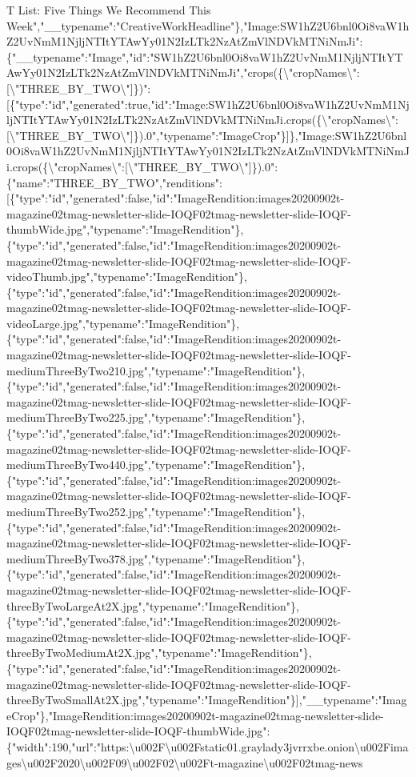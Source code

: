 T List: Five Things We Recommend This
Week","\_\_typename":"CreativeWorkHeadline"\},"Image:SW1hZ2U6bnl0Oi8vaW1hZ2UvNmM1NjljNTItYTAwYy01N2IzLTk2NzAtZmVlNDVkMTNiNmJi":\{"\_\_typename":"Image","id":"SW1hZ2U6bnl0Oi8vaW1hZ2UvNmM1NjljNTItYTAwYy01N2IzLTk2NzAtZmVlNDVkMTNiNmJi","crops(\{\textbackslash{}"cropNames\textbackslash{}":{[}\textbackslash{}"THREE\_BY\_TWO\textbackslash{}"{]}\})":{[}\{"type":"id","generated":true,"id":"Image:SW1hZ2U6bnl0Oi8vaW1hZ2UvNmM1NjljNTItYTAwYy01N2IzLTk2NzAtZmVlNDVkMTNiNmJi.crops(\{\textbackslash{}"cropNames\textbackslash{}":{[}\textbackslash{}"THREE\_BY\_TWO\textbackslash{}"{]}\}).0","typename":"ImageCrop"\}{]}\},"Image:SW1hZ2U6bnl0Oi8vaW1hZ2UvNmM1NjljNTItYTAwYy01N2IzLTk2NzAtZmVlNDVkMTNiNmJi.crops(\{\textbackslash{}"cropNames\textbackslash{}":{[}\textbackslash{}"THREE\_BY\_TWO\textbackslash{}"{]}\}).0":\{"name":"THREE\_BY\_TWO","renditions":{[}\{"type":"id","generated":false,"id":"ImageRendition:images20200902t-magazine02tmag-newsletter-slide-IOQF02tmag-newsletter-slide-IOQF-thumbWide.jpg","typename":"ImageRendition"\},\{"type":"id","generated":false,"id":"ImageRendition:images20200902t-magazine02tmag-newsletter-slide-IOQF02tmag-newsletter-slide-IOQF-videoThumb.jpg","typename":"ImageRendition"\},\{"type":"id","generated":false,"id":"ImageRendition:images20200902t-magazine02tmag-newsletter-slide-IOQF02tmag-newsletter-slide-IOQF-videoLarge.jpg","typename":"ImageRendition"\},\{"type":"id","generated":false,"id":"ImageRendition:images20200902t-magazine02tmag-newsletter-slide-IOQF02tmag-newsletter-slide-IOQF-mediumThreeByTwo210.jpg","typename":"ImageRendition"\},\{"type":"id","generated":false,"id":"ImageRendition:images20200902t-magazine02tmag-newsletter-slide-IOQF02tmag-newsletter-slide-IOQF-mediumThreeByTwo225.jpg","typename":"ImageRendition"\},\{"type":"id","generated":false,"id":"ImageRendition:images20200902t-magazine02tmag-newsletter-slide-IOQF02tmag-newsletter-slide-IOQF-mediumThreeByTwo440.jpg","typename":"ImageRendition"\},\{"type":"id","generated":false,"id":"ImageRendition:images20200902t-magazine02tmag-newsletter-slide-IOQF02tmag-newsletter-slide-IOQF-mediumThreeByTwo252.jpg","typename":"ImageRendition"\},\{"type":"id","generated":false,"id":"ImageRendition:images20200902t-magazine02tmag-newsletter-slide-IOQF02tmag-newsletter-slide-IOQF-mediumThreeByTwo378.jpg","typename":"ImageRendition"\},\{"type":"id","generated":false,"id":"ImageRendition:images20200902t-magazine02tmag-newsletter-slide-IOQF02tmag-newsletter-slide-IOQF-threeByTwoLargeAt2X.jpg","typename":"ImageRendition"\},\{"type":"id","generated":false,"id":"ImageRendition:images20200902t-magazine02tmag-newsletter-slide-IOQF02tmag-newsletter-slide-IOQF-threeByTwoMediumAt2X.jpg","typename":"ImageRendition"\},\{"type":"id","generated":false,"id":"ImageRendition:images20200902t-magazine02tmag-newsletter-slide-IOQF02tmag-newsletter-slide-IOQF-threeByTwoSmallAt2X.jpg","typename":"ImageRendition"\}{]},"\_\_typename":"ImageCrop"\},"ImageRendition:images20200902t-magazine02tmag-newsletter-slide-IOQF02tmag-newsletter-slide-IOQF-thumbWide.jpg":\{"width":190,"url":"https:\textbackslash{}u002F\textbackslash{}u002Fstatic01.graylady3jvrrxbe.onion\textbackslash{}u002Fimages\textbackslash{}u002F2020\textbackslash{}u002F09\textbackslash{}u002F02\textbackslash{}u002Ft-magazine\textbackslash{}u002F02tmag-news